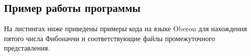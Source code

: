 \subsection{Пример работы программы}
На листингах ниже приведены примеры кода на языке Oberon для нахождения пятого числа Фибоначчи и соответствующие файлы промежуточного представления. 







\label{lst:fib-array-ll}